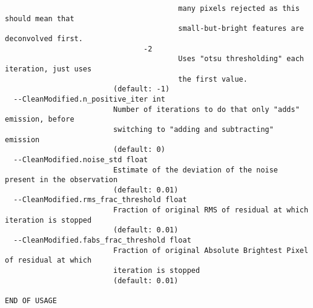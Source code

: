 \begin{verbatim}
                                        many pixels rejected as this should mean that 
                                        small-but-bright features are deconvolved first.
                                -2
                                        Uses "otsu thresholding" each iteration, just uses 
                                        the first value.
                         (default: -1)
  --CleanModified.n_positive_iter int
                         Number of iterations to do that only "adds" emission, before 
                         switching to "adding and subtracting" emission
                         (default: 0)
  --CleanModified.noise_std float
                         Estimate of the deviation of the noise present in the observation
                         (default: 0.01)
  --CleanModified.rms_frac_threshold float
                         Fraction of original RMS of residual at which iteration is stopped
                         (default: 0.01)
  --CleanModified.fabs_frac_threshold float
                         Fraction of original Absolute Brightest Pixel of residual at which 
                         iteration is stopped
                         (default: 0.01)

END OF USAGE
\end{verbatim}
\endgroup






















































